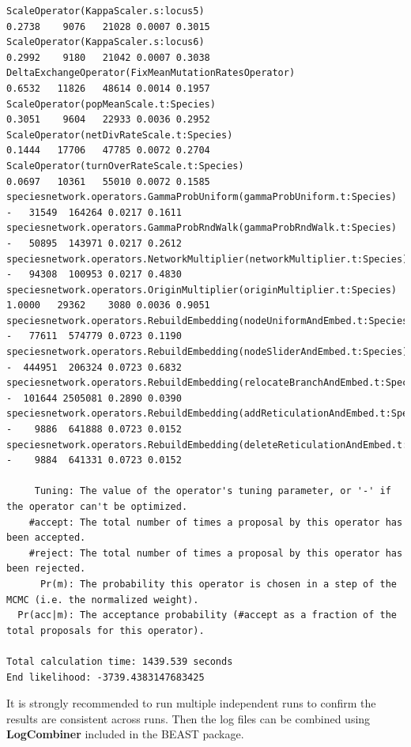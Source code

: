 \documentclass[11pt]{article}
\begin{document}
{\begin{verbatim}
ScaleOperator(KappaScaler.s:locus5)                                        0.2738    9076   21028 0.0007 0.3015 
ScaleOperator(KappaScaler.s:locus6)                                        0.2992    9180   21042 0.0007 0.3038 
DeltaExchangeOperator(FixMeanMutationRatesOperator)                        0.6532   11826   48614 0.0014 0.1957 
ScaleOperator(popMeanScale.t:Species)                                      0.3051    9604   22933 0.0036 0.2952 
ScaleOperator(netDivRateScale.t:Species)                                   0.1444   17706   47785 0.0072 0.2704 
ScaleOperator(turnOverRateScale.t:Species)                                 0.0697   10361   55010 0.0072 0.1585 
speciesnetwork.operators.GammaProbUniform(gammaProbUniform.t:Species)           -   31549  164264 0.0217 0.1611 
speciesnetwork.operators.GammaProbRndWalk(gammaProbRndWalk.t:Species)           -   50895  143971 0.0217 0.2612 
speciesnetwork.operators.NetworkMultiplier(networkMultiplier.t:Species)         -   94308  100953 0.0217 0.4830 
speciesnetwork.operators.OriginMultiplier(originMultiplier.t:Species)      1.0000   29362    3080 0.0036 0.9051 
speciesnetwork.operators.RebuildEmbedding(nodeUniformAndEmbed.t:Species)        -   77611  574779 0.0723 0.1190 
speciesnetwork.operators.RebuildEmbedding(nodeSliderAndEmbed.t:Species)         -  444951  206324 0.0723 0.6832 
speciesnetwork.operators.RebuildEmbedding(relocateBranchAndEmbed.t:Species)     -  101644 2505081 0.2890 0.0390 
speciesnetwork.operators.RebuildEmbedding(addReticulationAndEmbed.t:Species)    -    9886  641888 0.0723 0.0152 
speciesnetwork.operators.RebuildEmbedding(deleteReticulationAndEmbed.t:Species) -    9884  641331 0.0723 0.0152 

     Tuning: The value of the operator's tuning parameter, or '-' if the operator can't be optimized.
    #accept: The total number of times a proposal by this operator has been accepted.
    #reject: The total number of times a proposal by this operator has been rejected.
      Pr(m): The probability this operator is chosen in a step of the MCMC (i.e. the normalized weight).
  Pr(acc|m): The acceptance probability (#accept as a fraction of the total proposals for this operator).

Total calculation time: 1439.539 seconds
End likelihood: -3739.4383147683425
\end{verbatim}}

It is strongly recommended to run multiple independent runs to confirm the results are consistent across runs. Then the log files can be combined using \textbf{LogCombiner} included in the BEAST package.
\end{document}
